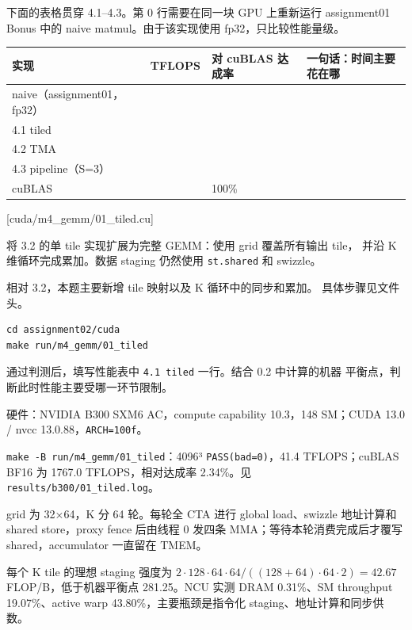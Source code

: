 \documentclass[11pt,a4paper,fontset=fandol]{ctexart}
\begin{document}
下面的表格贯穿 4.1--4.3。第 0 行需要在同一块 GPU 上重新运行 assignment01
Bonus 中的 naive matmul。由于该实现使用 fp32，只比较性能量级。

\begin{longtable}[]{@{}llll@{}}
\toprule\noalign{}
实现 & TFLOPS & 对 cuBLAS 达成率 & 一句话：时间主要花在哪 \\
\midrule\noalign{}
\endhead
\bottomrule\noalign{}
\endlastfoot
naive（assignment01，fp32） & & & \\
4.1 tiled & & & \\
4.2 TMA & & & \\
4.3 pipeline（S=3） & & & \\
cuBLAS & & 100\% & \\
\end{longtable}

[cuda/m4\_gemm/01\_tiled.cu]

将 3.2 的单 tile 实现扩展为完整 GEMM：使用 grid 覆盖所有输出 tile， 并沿
K 维循环完成累加。数据 staging 仍然使用 \texttt{st.\allowbreak{}shared}
和 swizzle。

相对 3.2，本题主要新增 tile 映射以及 K 循环中的同步和累加。
具体步骤见文件头。

\begin{verbatim}
cd assignment02/cuda
make run/m4_gemm/01_tiled
\end{verbatim}

通过判测后，填写性能表中 \texttt{4.\allowbreak{}1\ tiled} 一行。结合 0.2
中计算的机器 平衡点，判断此时性能主要受哪一环节限制。

\begin{answer}

硬件：NVIDIA B300 SXM6 AC，compute capability 10.3，148 SM；CUDA 13.0 /
nvcc 13.0.88，\texttt{ARCH=\allowbreak{}100f}。

\texttt{make\ -\allowbreak{}B\ run/\allowbreak{}m4\_\allowbreak{}gemm/\allowbreak{}01\_\allowbreak{}tiled}：4096³
\texttt{PASS(bad=\allowbreak{}0)}，41.4 TFLOPS；cuBLAS BF16 为 1767.0
TFLOPS，相对达成率 2.34\%。见
\texttt{results/\allowbreak{}b300/\allowbreak{}01\_\allowbreak{}tiled.\allowbreak{}log}。

grid 为 32×64，K 分 64 轮。每轮全 CTA 进行 global load、swizzle
地址计算和 shared store，proxy fence 后由线程 0 发四条
MMA；等待本轮消费完成后才覆写 shared，accumulator 一直留在 TMEM。

每个 K tile 的理想 staging 强度为
\(2\cdot128\cdot64\cdot64/((128+64)\cdot64\cdot2)=42.67\)
FLOP/B，低于机器平衡点 281.25。NCU 实测 DRAM 0.31\%、SM throughput
19.07\%、active warp 43.80\%，主要瓶颈是指令化
staging、地址计算和同步供数。

\end{answer}
\end{document}

